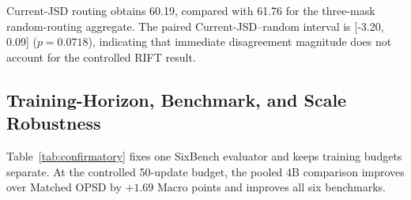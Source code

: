 \documentclass[letterpaper]{article}
\newcommand{\RIFT}{\textsc{RIFT}}
\begin{document}
Current-JSD routing obtains 60.19, compared with 61.76 for the three-mask
random-routing aggregate. The paired Current-JSD--random interval is
[-3.20, 0.09] ($p=0.0718$), indicating that immediate disagreement magnitude
does not account for the controlled \RIFT{} result.

\subsection{Training-Horizon, Benchmark, and Scale Robustness}

Table~\ref{tab:confirmatory} fixes one SixBench evaluator and keeps training
budgets separate. At the controlled 50-update budget, the pooled 4B comparison
improves over Matched OPSD by $+1.69$ Macro points and improves all six
benchmarks.
\WOneResultSentence{} \ScaleResultSentence{}
\end{document}
